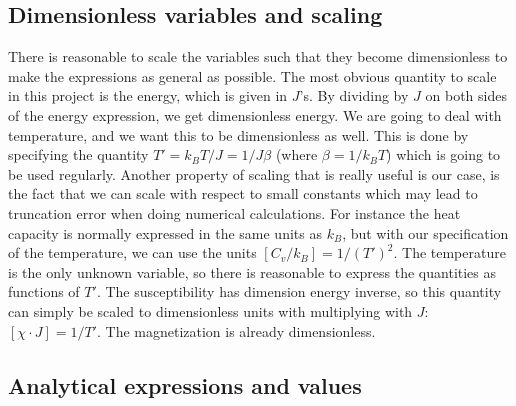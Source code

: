 \documentclass[norsk,a4paper,12pt]{article}
\begin{document}
\subsection{Dimensionless variables and scaling}
There is reasonable to scale the variables such that they become dimensionless to make the expressions as general as possible. The most obvious quantity to scale in this project is the energy, which is given in $J$'s. By dividing by $J$ on both sides of the energy expression, we get dimensionless energy. We are going to deal with temperature, and we want this to be dimensionless as well. This is done by specifying the quantity $T'=k_BT/J=1/J\beta$ (where $\beta=1/k_BT$) which is going to be used regularly. Another property of scaling that is really useful is our case, is the fact that we can scale with respect to small constants which may lead to truncation error when doing numerical calculations. For instance the heat capacity is normally expressed in the same units as $k_B$, but with our specification of the temperature, we can use the units $[C_v/k_B]=1/(T')^2$.  The temperature is the only unknown variable, so there is reasonable to express the quantities as functions of $T'$. The susceptibility has dimension energy inverse, so this quantity can simply be scaled to dimensionless units with multiplying with $J$: $[\chi\cdot J]=1/T'$. The magnetization is already dimensionless.\par\vspace{5mm}

\subsection{Analytical expressions and values}
\end{document}
